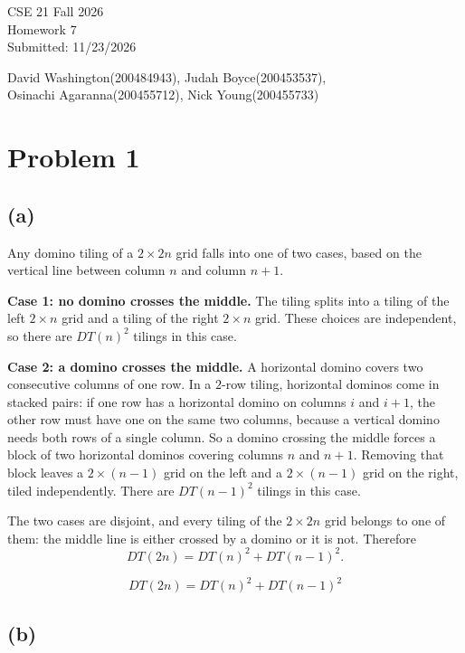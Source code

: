 \documentclass[11pt]{article}
\begin{document}
\begin{flushright}
CSE 21 Fall 2026\\
Homework 7\\
Submitted: 11/23/2026
\end{flushright}

\begin{center}
David Washington(200484943), Judah Boyce(200453537),\\
Osinachi Agaranna(200455712), Nick Young(200455733)
\end{center}

\section*{Problem 1}

\subsection*{(a)}

Any domino tiling of a $2\times 2n$ grid falls into one of two cases, based on the vertical line between column $n$ and column $n+1$.

\textbf{Case 1: no domino crosses the middle.}
The tiling splits into a tiling of the left $2\times n$ grid and a tiling of the right $2\times n$ grid. These choices are independent, so there are $DT(n)^{2}$ tilings in this case.

\textbf{Case 2: a domino crosses the middle.}
A horizontal domino covers two consecutive columns of one row. In a $2$-row tiling, horizontal dominos come in stacked pairs: if one row has a horizontal domino on columns $i$ and $i+1$, the other row must have one on the same two columns, because a vertical domino needs both rows of a single column. So a domino crossing the middle forces a block of two horizontal dominos covering columns $n$ and $n+1$. Removing that block leaves a $2\times(n-1)$ grid on the left and a $2\times(n-1)$ grid on the right, tiled independently. There are $DT(n-1)^{2}$ tilings in this case.

The two cases are disjoint, and every tiling of the $2\times 2n$ grid belongs to one of them: the middle line is either crossed by a domino or it is not. Therefore
\[
DT(2n)=DT(n)^{2}+DT(n-1)^{2}.
\]

\[
\boxed{DT(2n)=DT(n)^{2}+DT(n-1)^{2}}
\]

\subsection*{(b)}
\end{document}
